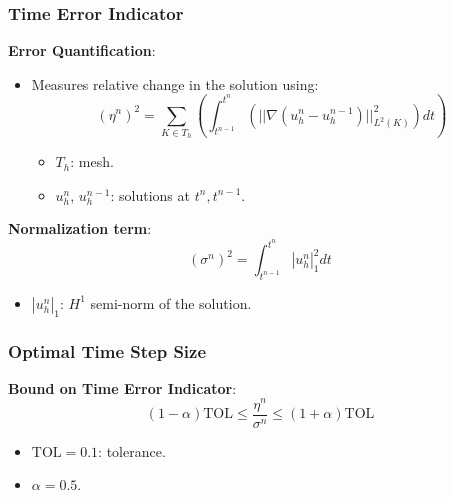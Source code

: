 \documentclass{settings/laserbeam}
\begin{document}
\begin{frame}

    \frametitle{Time Error Indicator}

    \begin{cbox}
    \textbf{Error Quantification}:
    \begin{itemize}
        \item Measures relative change in the solution using:
        $$
        (\eta^n)^2 = \sum_{K\in T_h} \left( \int_{t^{n-1}}^{t^n} \left(||\nabla\left(u_h^{n}-u_h^{n-1}\right)||^2_{L^2(K)}\right)dt \right)
        $$
        \begin{itemize}
            \item $T_h$: mesh.
            \item $u_h^{n}$, $u_h^{n-1}$: solutions at $t^n, t^{n-1}$.
        \end{itemize}
    \end{itemize}
    \textbf{Normalization term}:
    $$
    (\sigma^n)^2 = \int_{t^{n-1}}^{t^n} |u_h^{n}|^2_{1}dt
    $$
    \begin{itemize}
        \item $|u_h^{n}|_{1}$: $H^1$ semi-norm of the solution.
    \end{itemize}
    \end{cbox}
\end{frame}

\begin{frame}
    
    \frametitle{Optimal Time Step Size}

    \begin{cbox}
    \textbf{Bound on Time Error Indicator}:
    $$
    (1-\alpha)\text{TOL}\leq\frac{\eta^n}{\sigma^n}\leq(1+\alpha)\text{TOL}
    $$
    \begin{itemize}
        \item $\text{TOL}=0.1$: tolerance.
        \item $\alpha=0.5$.
    \end{itemize}
    \end{cbox}
\end{frame}
\end{document}
